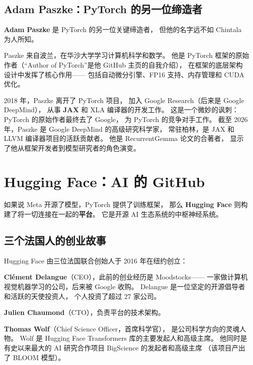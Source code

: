 \subsection{Adam Paszke：PyTorch 的另一位缔造者}

\textbf{Adam Paszke} 是 PyTorch 的另一位关键缔造者，
但他的名字远不如 Chintala 为人所知。

Paszke 来自波兰，在华沙大学学习计算机科学和数学。
他是 PyTorch 框架的原始作者（``Author of PyTorch''是他 GitHub 主页的自我介绍），
在框架的底层架构设计中发挥了核心作用——
包括自动微分引擎、FP16 支持、内存管理和 CUDA 优化。

2018 年，Paszke 离开了 PyTorch 项目，
加入 Google Research（后来是 Google DeepMind），
从事 \textbf{JAX} 和 XLA 编译器的开发工作。
这是一个微妙的讽刺：PyTorch 的原始作者最终去了 Google，
为 PyTorch 的竞争对手工作。
截至 2026 年，Paszke 是 Google DeepMind 的高级研究科学家，
常驻柏林，是 JAX 和 LLVM 编译器项目的活跃贡献者。
他是 RecurrentGemma 论文的合著者，
显示了他从框架开发者到模型研究者的角色演变。


\section{Hugging Face：AI 的 GitHub}
\label{sec:huggingface}

如果说 Meta 开源了模型，PyTorch 提供了训练框架，
那么 \textbf{Hugging Face} 则构建了将一切连接在一起的\textbf{平台}。
它是开源 AI 生态系统的中枢神经系统。

\subsection{三个法国人的创业故事}

Hugging Face 由三位法国联合创始人于 2016 年在纽约创立：

\textbf{Cl\'ement Delangue}（CEO），此前的创业经历是 Moodstocks——
一家做计算机视觉机器学习的公司，后来被 Google 收购。
Delangue 是一位坚定的开源倡导者和活跃的天使投资人，
个人投资了超过 27 家公司。

\textbf{Julien Chaumond}（CTO），负责平台的技术架构。

\textbf{Thomas Wolf}（Chief Science Officer，首席科学官），
是公司科学方向的灵魂人物。
Wolf 是 Hugging Face Transformers 库的主要发起人和高级主席。
他同时是有史以来最大的 AI 研究合作项目 BigScience 的发起者和高级主席
（该项目产出了 BLOOM 模型）。

